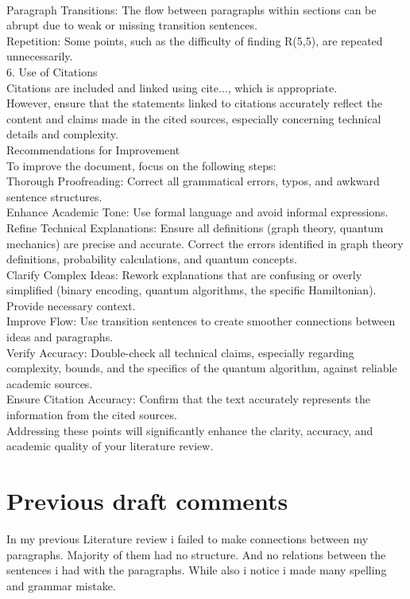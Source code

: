 \documentclass{Assignment}
\begin{document}
\begin{enumerate}
\\
Paragraph Transitions: The flow between paragraphs within sections can be abrupt due to weak or missing transition sentences.
\\
Repetition: Some points, such as the difficulty of finding R(5,5), are repeated unnecessarily.
\\
6. Use of Citations
\\
Citations are included and linked using  cite{...}, which is appropriate.
\\
However, ensure that the statements linked to citations accurately reflect the content and claims made in the cited sources, especially concerning technical details and complexity.
\\
Recommendations for Improvement
\\
To improve the document, focus on the following steps:
\\
Thorough Proofreading: Correct all grammatical errors, typos, and awkward sentence structures.
\\
Enhance Academic Tone: Use formal language and avoid informal expressions.
\\
Refine Technical Explanations: Ensure all definitions (graph theory, quantum mechanics) are precise and accurate. Correct the errors identified in graph theory definitions, probability calculations, and quantum concepts.
\\
Clarify Complex Ideas: Rework explanations that are confusing or overly simplified (binary encoding, quantum algorithms, the specific Hamiltonian). Provide necessary context.
\\
Improve Flow: Use transition sentences to create smoother connections between ideas and paragraphs.
\\
Verify Accuracy: Double-check all technical claims, especially regarding complexity, bounds, and the specifics of the quantum algorithm, against reliable academic sources.
\\
Ensure Citation Accuracy: Confirm that the text accurately represents the information from the cited sources.
\\
Addressing these points will significantly enhance the clarity, accuracy, and academic quality of your literature review.

\end{enumerate}
\section*{Previous draft comments}
In my previous Literature review i failed to make connections between my paragraphs.
Majority of them had no structure.
And no relations between the sentences i had with the paragraphs.
While also i notice i made many spelling and grammar mistake.
\newpage

\end{document}
